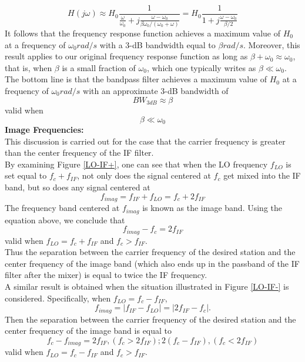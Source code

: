 \documentclass{article}
\begin{document}
$$H(j\omega)\approx H_0\frac{1}{\frac{\omega}{\omega_0}+j\frac{\omega-\omega_0}{\beta\omega_0/(\omega_0+\omega)}} = H_0\frac{1}{1+j\frac{\omega-\omega_0}{\beta/2}}$$
It follows that the frequency response function achieves a maximum value of $H_0$ at a frequency of $\omega_0 rad/s$ with a 3-dB bandwidth equal to $\beta rad/s$. Moreover, this result applies to our original frequency response function as long as $\beta + \omega_0\approx\omega_0$, that is, when $\beta$ is a small fraction of $\omega_0$, which one typically writes as $\beta\ll\omega_0$.\\
The bottom line is that the bandpass filter achieves a maximum value of $H_0$ at a frequency of $\omega_0 rad/s$ with an approximate 3-dB bandwidth of
$$BW_{3dB}\approx\beta$$
valid when
$$\beta\ll\omega_0$$
\textbf{Image Frequencies:}\\
This discussion is carried out for the case that the carrier frequency is greater than the center frequency of the IF filter.\\
By examining Figure \ref{LO-IF+}, one can see that when the LO frequency $f_{LO}$ is set equal to $f_c + f_{IF}$, not only does the signal centered at $f_c$ get mixed into the IF band, but so does any signal centered at
$$f_{imag} = f_{IF} + f_{LO} = f_c + 2f_{IF}$$
The frequency band centered at $f_{imag}$ is known as the image band. Using the equation above, we conclude that
$$f_{imag}-f_c = 2f_{IF}$$
valid when $f_{LO} = f_c + f_{IF}$ and $f_c >f_{IF}$.\\
Thus the separation between the carrier frequency of the desired station and the center frequency of the image band (which also ends up in the passband of the IF filter after the mixer) is equal to twice the IF frequency.\\
A similar result is obtained when the situation illustrated in Figure \ref{LO-IF-} is considered. Specifically, when $f_{LO} = f_c − f_{IF}$,
$$f_{imag} = |f_{IF}-f_{LO}| = |2f_{IF}-f_c|.$$
Then the separation between the carrier frequency of the desired station and the center frequency of the image band is equal to
$$f_c -f_{imag} = 2f_{IF},(f_c>2f_{IF}); 2(f_c-f_{IF}),(f_c<2f_{IF})$$
valid when $f_{LO} = f_c-f_{IF}$ and $f_c>f_{IF}$.\\
\end{document}
